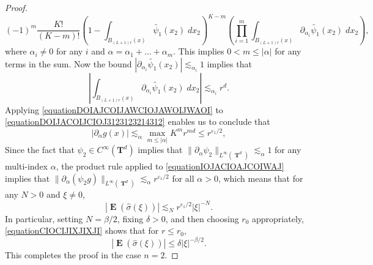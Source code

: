 \documentclass[dvipsnames,letterpaper,12pt]{article}
\numberwithin{equation}{section}
\DeclareMathOperator{\TT}{\mathbf{T}}
\numberwithin{theorem}{section}
\DeclareMathOperator{\EE}{\mathbf{E}}
\begin{document}
\begin{proof}
\begin{equation}
        (-1)^m \frac{K!}{(K-m)!} \left( 1 - \int_{B_{(L+1) r}(x)} \tilde{\psi_1}(x_2)\; dx_2 \right)^{K-m} \left( \prod_{i = 1}^{m} \int_{B_{(L+1)r}(x)} \partial_{\alpha_i} \tilde{\psi_1}(x_2)\; dx_2 \right),
    \end{equation}
    where $\alpha_i \neq 0$ for any $i$ and $\alpha = \alpha_1 + \dots + \alpha_m$. This implies $0 < m \leq |\alpha|$ for any terms in the sum. Now the bound $|\partial_{\alpha_i} \tilde{\psi_1}(x_2)| \lesssim_{\alpha_i} 1$ implies that
    \begin{equation} \label{equationDOIAJCOIJAWCIOJAWOIJWAOI}
        \left| \int_{B_{(L+1)r}(x)} \partial_{\alpha_i} \tilde{\psi_1}(x_2)\; dx_2 \right| \lesssim_{\alpha_i} r^d.
    \end{equation}
    Applying \eqref{equationDOIAJCOIJAWCIOJAWOIJWAOI} to \eqref{equationDOIJACOIJCIOJ3123123214312} enables us to conclude that
    \begin{equation} \label{equationIOJACIOAJCOIWAJ}
        |\partial_\alpha g(x)| \lesssim_\alpha \max_{m \leq |\alpha|} K^m r^{md} \leq r^{\varepsilon_1/2},
    \end{equation}
    Since the fact that $\psi_2 \in C^\infty(\mathbf{T}^d)$ implies that $\| \partial_\alpha \psi_2 \|_{L^\infty(\TT^d)} \lesssim_\alpha 1$ for any multi-index $\alpha$, the product rule applied to \eqref{equationIOJACIOAJCOIWAJ} implies that $\| \partial_\alpha (\psi_2 g) \|_{L^\infty(\TT^d)} \lesssim_\alpha r^{\varepsilon_1/2}$ for all $\alpha > 0$, which means that for any $N > 0$ and $\xi \neq 0$,
    \begin{equation} \label{equationCIOCIJIXJIXJI}
        |\EE(\widehat{\sigma}(\xi))| \lesssim_N r^{\varepsilon_1/2} |\xi|^{-N}.
    \end{equation}
    In particular, setting $N = \beta/2$, fixing $\delta > 0$, and then choosing $r_0$ appropriately, \eqref{equationCIOCIJIXJIXJI} shows that for $r \leq r_0$,
    \begin{equation}
        |\EE(\widehat{\sigma}(\xi))| \leq \delta |\xi|^{-\beta/2}.
    \end{equation}
    This completes the proof in the case $n = 2$.


\end{proof}
\end{document}
